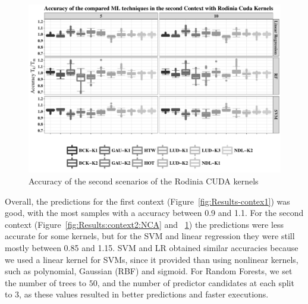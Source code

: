 \begin{figure}[htpb]
    \centering
    \includegraphics[scale=.5]{images/ResultTechniques-Context2-Rodinia.pdf}
    \caption{Accuracy of the second scenarios of the Rodinia CUDA kernels}
    \label{fig:Results:context2:Rodinia}
\end{figure}

Overall, the predictions for the first context (Figure~\ref{fig:Results-contex1}) was good, with the most samples with a accuracy between 0.9 and 1.1. For the second context (Figure~\ref{fig:Results:context2:NCA} and ~\ref{fig:Results:context2:Rodinia}) the predictions were less accurate for some kernels, but for the SVM and linear regression they were still mostly between 0.85 and 1.15. SVM and LR obtained similar accuracies because we used a linear kernel for SVMs, since it provided than using nonlinear kernels, such as polynomial, Gaussian (RBF) and sigmoid. For Random Forests, we set the number of trees to $50$, and the number of predictor candidates at each split to $3$, as these values resulted in better predictions and faster executions. 
